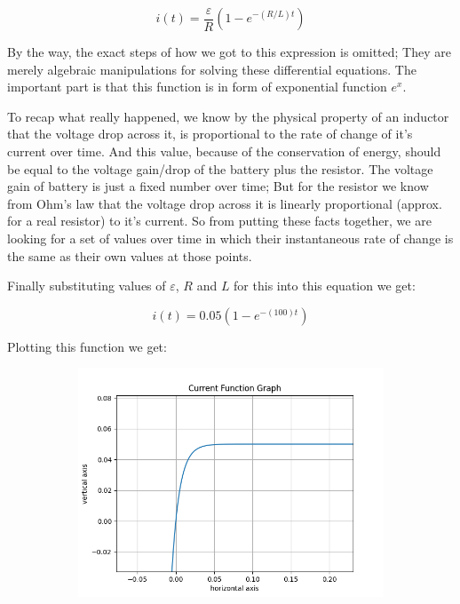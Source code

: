 \documentclass{article}
\begin{document}
	\begin{equation}
	 	i(t) = \frac{\varepsilon}{R}(1 - e^{-(R/L)t})
	\end{equation}
	
	By the way, the exact steps of how we got to this expression is omitted; They are merely algebraic manipulations for solving these differential equations. The important part is that this function is in form of exponential function $e^x$.
	
	To recap what really happened, we know by the physical property of an inductor that the voltage drop across it, is proportional to the rate of change of it's current over time. And this value, because of the conservation of energy, should be equal to the voltage gain/drop of the battery plus the resistor. The voltage gain of battery is just a fixed number over time; But for the resistor we know from Ohm's law that the voltage drop across it is linearly proportional (approx. for a real resistor) to it's current. So from putting these facts together, we are looking for a set of values over time in which their instantaneous rate of change is the same as their own values at those points.
	
	Finally substituting values of $\varepsilon$, $R$ and $L$ for this into this equation we get:
	
	$$ i(t) = 0.05(1 - e^{-(100)t})  $$
	
	Plotting this function we get:
	\begin{figure}[h!]
		\centering
		\begin{subfigure}[b]{0.9\linewidth}
			\includegraphics[width=\linewidth]{Figure_1.png}
		\end{subfigure}
	\end{figure}
\end{document}

